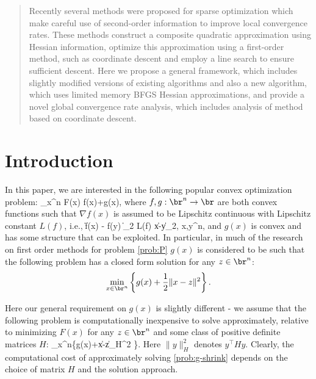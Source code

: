 \documentclass[11pt]{article}
\numberwithin{equation}{section}
\begin{document}
\begin{abstract}
Recently several methods were proposed for sparse optimization which make careful use of second-order information \cite{Hsieh2011,nGLMNET,Olsen2012,Chin2012} to improve local convergence  rates. These methods construct a composite quadratic  approximation using Hessian information, optimize this approximation using a first-order method, such as coordinate descent and employ a line search to  ensure sufficient descent.
Here we propose a general framework, which includes slightly modified versions of existing algorithms and also a new algorithm, which uses limited memory BFGS Hessian approximations,   and provide a novel global convergence rate analysis, which includes analysis of method based on coordinate descent. 

\end{abstract}



\section{Introduction} %
\label{sec:introduction}
In this paper, we are interested in the following popular convex optimization problem: \bea\label{prob:P} \min_{x\in\br^n} F(x)\equiv
f(x)+g(x), \eea where $f,g:\br^n\rightarrow\br$ are both convex
functions such that  $\nabla f(x)$ is assumed to be Lipschitz continuous with Lipschitz constant $L(f)$, i.e., \beaa \|\nabla f(x) - \nabla f(y) \|_2 \leq L(f) \|x-y\|_2, \quad \forall x,y\in\br^n,\eeaa
and $g(x)$ is convex and has some structure that can be exploited. In particular,  in much of the research on first order methods for problem \eqref{prob:P}  $g(x)$ is considered to be such that   the following problem has a closed form solution
 for any $z\in\br^n$:
 \[\min_{x\in\br^n}\left\{g(x)+\frac{1}{2}\|x-z\|^2 \right\}.
 \]
 
 Here our general requirement on $g(x)$ is slightly different - we assume that the following problem is
 computationally inexpensive to solve approximately, relative to minimizing $F(x)$
 for any $z\in\br^n$ and some class of positive definite matrices $H$:
 \bea\label{prob:g-shrink}\min_{x\in\br^n}\left\{g(x)+\|x-z\|_H^2 \right\}.\eea
 Here $\|y\|^2_H$ denotes $y^\top H y$.   Clearly, the computational cost of approximately solving \eqref{prob:g-shrink} depends on the choice of matrix $H$ and the solution approach. 
 
\end{document}
